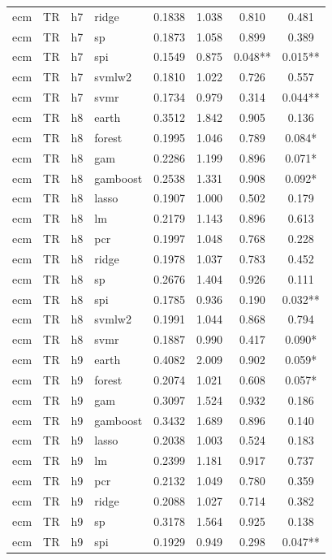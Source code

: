\begin{ThreePartTable}
\begin{longtable}[t]{llclcccc}
ecm & TR & h7 & ridge & 0.1838 & 1.038 & 0.810 & 0.481\\
ecm & TR & h7 & sp & 0.1873 & 1.058 & 0.899 & 0.389\\
ecm & TR & h7 & spi & 0.1549 & 0.875 & 0.048** & 0.015**\\
ecm & TR & h7 & svmlw2 & 0.1810 & 1.022 & 0.726 & 0.557\\
ecm & TR & h7 & svmr & 0.1734 & 0.979 & 0.314 & 0.044**\\
\addlinespace
ecm & TR & h8 & earth & 0.3512 & 1.842 & 0.905 & 0.136\\
ecm & TR & h8 & forest & 0.1995 & 1.046 & 0.789 & 0.084*\\
ecm & TR & h8 & gam & 0.2286 & 1.199 & 0.896 & 0.071*\\
ecm & TR & h8 & gamboost & 0.2538 & 1.331 & 0.908 & 0.092*\\
ecm & TR & h8 & lasso & 0.1907 & 1.000 & 0.502 & 0.179\\
ecm & TR & h8 & lm & 0.2179 & 1.143 & 0.896 & 0.613\\
ecm & TR & h8 & pcr & 0.1997 & 1.048 & 0.768 & 0.228\\
ecm & TR & h8 & ridge & 0.1978 & 1.037 & 0.783 & 0.452\\
ecm & TR & h8 & sp & 0.2676 & 1.404 & 0.926 & 0.111\\
ecm & TR & h8 & spi & 0.1785 & 0.936 & 0.190 & 0.032**\\
ecm & TR & h8 & svmlw2 & 0.1991 & 1.044 & 0.868 & 0.794\\
ecm & TR & h8 & svmr & 0.1887 & 0.990 & 0.417 & 0.090*\\
\addlinespace
ecm & TR & h9 & earth & 0.4082 & 2.009 & 0.902 & 0.059*\\
ecm & TR & h9 & forest & 0.2074 & 1.021 & 0.608 & 0.057*\\
ecm & TR & h9 & gam & 0.3097 & 1.524 & 0.932 & 0.186\\
ecm & TR & h9 & gamboost & 0.3432 & 1.689 & 0.896 & 0.140\\
ecm & TR & h9 & lasso & 0.2038 & 1.003 & 0.524 & 0.183\\
ecm & TR & h9 & lm & 0.2399 & 1.181 & 0.917 & 0.737\\
ecm & TR & h9 & pcr & 0.2132 & 1.049 & 0.780 & 0.359\\
ecm & TR & h9 & ridge & 0.2088 & 1.027 & 0.714 & 0.382\\
ecm & TR & h9 & sp & 0.3178 & 1.564 & 0.925 & 0.138\\
ecm & TR & h9 & spi & 0.1929 & 0.949 & 0.298 & 0.047**\\

\end{longtable}
\end{ThreePartTable}
